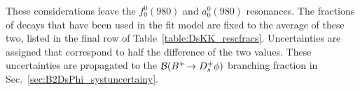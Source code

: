 These considerations leave the $f_{0}^{0}(980)$ and $a_{0}^{0}(980)$ resonances. The fractions of \decay{\Bp}{\Dsp\Kp\Km} decays that have been used in the fit model are fixed to the average of these two, listed in the final row of Table~\ref{table:DsKK_rescfracs}. Uncertainties are assigned that correspond to half the difference of the two values. These uncertainties are propagated to the ${\mathcal{B}}({{{B}^+}}\!\rightarrow {\ensuremath{{D}^+_{s}}}\phi)$ branching fraction in Sec.~\ref{sec:B2DsPhi_systuncertainy}. 

